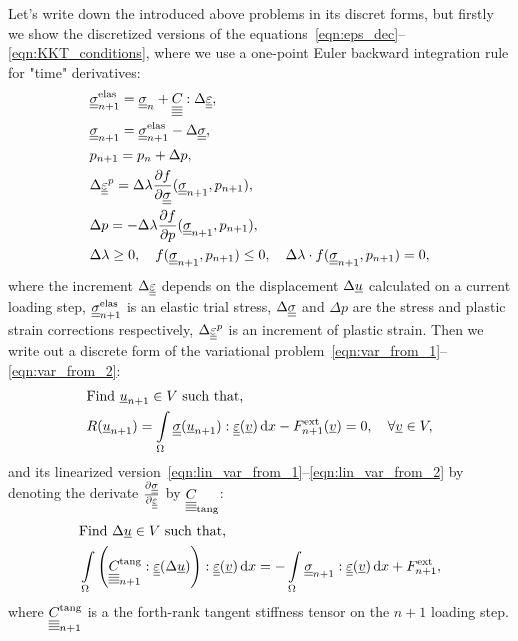 \documentclass[12pt]{article}
\begin{document}
Let's write down the introduced above problems in its discret forms, but firstly we show the discretized versions of the equations~\eqref{eqn:eps_dec}--\eqref{eqn:KKT_conditions}, where we use a one-point Euler backward integration rule for "time" derivatives:
\begin{align}
    & \uusigmanelas = \uusigma_n + \uuuuC{} : \Delta\uueps \label{eqn:return_mapping_begin},\\
    & \uusigman = \uusigmanelas - \Delta\uusigma, \\
    & p_{n+1} = p_n + \Delta p, \\%
    & \Delta\uueps^p = \Delta\lambda\frac{\partial f}{\partial \uusigma} (\uusigman, p_{n+1}), \\
    & \Delta p = -\Delta\lambda\frac{\partial f}{\partial p} (\uusigman, p_{n+1}), \\
    & \Delta\lambda \geq 0, \quad f(\uusigman, p_{n+1}) \leq 0, \quad \Delta\lambda\cdot f(\uusigman, p_{n+1}) = 0, \label{eqn:return_mapping_end}
\end{align}
where the increment $\Delta\underline{\underline{\varepsilon}}$ depends on the displacement $\Delta\underline{u}$ calculated on a current loading step, $\underline{\underline{\sigma}}_{n+1}^{\text{elas}}$ is an elastic trial stress, $\Delta\underline{\underline{\sigma}}$ and $\Delta p$ are the stress and plastic strain corrections respectively, $\Delta\underline{\underline{\varepsilon}}^p$ is an increment of plastic strain. 
Then we write out a discrete form of the variational problem~\eqref{eqn:var_from_1}--\eqref{eqn:var_from_2}:
\begin{align}
    & \text{Find } \underline{u}_{n+1} \in V \text{ such that,} \label{eqn:var_disc_from_1} \\ 
    & R(\underline{u}_{n+1}) = \int\limits_\Omega\underline{\underline{\sigma}}(\underline{u}_{n+1}) : \underline{\underline{\varepsilon}}(\underline{v}) \, \mathrm{d} x - F_{n+1}^\text{ext}(\underline{v}) = 0, \quad \forall \underline{v} \in V \label{eqn:var_disc_from_2},
\end{align}
and its linearized version~\eqref{eqn:lin_var_from_1}--\eqref{eqn:lin_var_from_2} by denoting the derivate $\frac{\partial\underline{\underline{\sigma}}}{\partial\underline{\underline{\varepsilon}}}$ by $\underline{\underline{\underline{\underline{C_{}}}}}_{\text{tang}}$:
\begin{align}
    & \text{Find } \Delta\underline{u} \in V \text{ such that,} \label{eqn:lin_var_disc_from_1} \\ 
    & \int\limits_\Omega \left(\underline{\underline{\underline{\underline{C_{}}}}}_{n+1}^\text{tang} : \underline{\underline{\varepsilon}}(\Delta\underline{u})\right) : \underline{\underline{\varepsilon}}(\underline{v}) \, \mathrm{d} x = -\int\limits_\Omega\underline{\underline{\sigma}}_{n+1} : \underline{\underline{\varepsilon}}(\underline{v}) \, \mathrm{d} x + F^\text{ext}_{n+1} \label{eqn:lin_var_disc_from_2},
\end{align}
where $\underline{\underline{\underline{\underline{C_{}}}}}_{n+1}^{\text{tang}}$ is a the forth-rank tangent stiffness tensor on the $n+1$ loading step.
\end{document}
